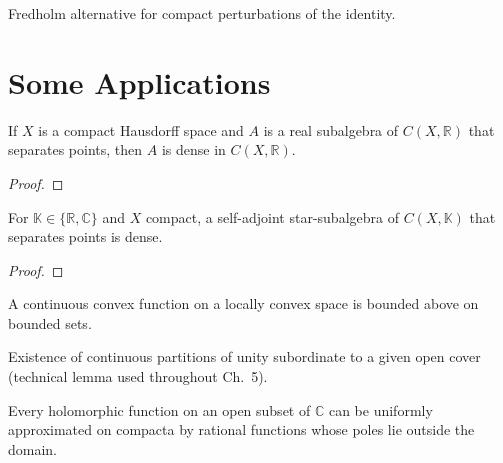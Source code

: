 \begin{theorem}
  \label{thm:fredholm}
  \leanok
  Fredholm alternative for compact perturbations of the identity.
\end{theorem}

\chapter{Some Applications}

\begin{theorem}
  \label{thm:stone-weierstrass}
  \leanok
  If $X$ is a compact Hausdorff space and $A$ is a real subalgebra of
  $C(X,\mathbb{R})$ that separates points, then $A$ is dense in
  $C(X,\mathbb{R})$.
\end{theorem}
\begin{proof}
  \leanok
\end{proof}

\begin{theorem}
  \label{thm:stone-weierstrass-star}
  \leanok
  For $\mathbb{K} \in \{\mathbb{R}, \mathbb{C}\}$ and $X$ compact, a
  self-adjoint star-subalgebra of $C(X, \mathbb{K})$ that separates
  points is dense.
\end{theorem}
\begin{proof}
  \leanok
\end{proof}


\begin{theorem}
  \label{thm:continuousConvex-boundedAbove}
  \leanok
  A continuous convex function on a locally convex space is bounded
  above on bounded sets.
\end{theorem}

\begin{theorem}
  \label{thm:partition-of-unity}
  \leanok
  Existence of continuous partitions of unity subordinate to a given
  open cover (technical lemma used throughout Ch.~5).
\end{theorem}

\begin{theorem}
  \label{thm:runge}
  \leanok
  Every holomorphic function on an open subset of $\mathbb C$ can be
  uniformly approximated on compacta by rational functions whose
  poles lie outside the domain.
\end{theorem}


